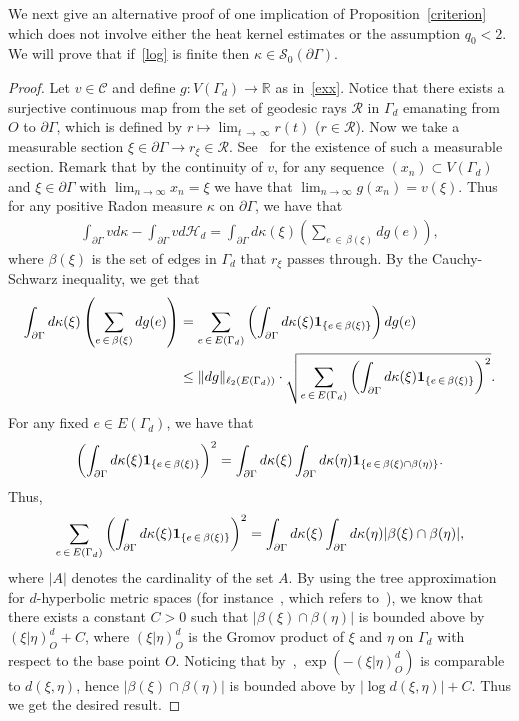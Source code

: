 \documentclass[10pt]{amsart}
\theoremstyle{definition}\newtheorem{defi}[theo]{Definition}\newtheorem{rema}[theo]{Remark}\newtheorem{exam}[theo]{Example}\newtheorem{exem}[theo]{Example}\newtheorem{nota}[theo]{Notation}
\newcommand{\cR}{\mathcal{R}}
\newcommand{\cs}{\mathcal{S}}
\newcommand{\ch}{\mathcal{H}}
\newcommand{\cC}{\mathcal{C}}
\newcommand{\br}{\mathbb{R}}
\begin{document}
We next give an alternative proof of one implication of Proposition~\ref{criterion} which does not involve either the heat kernel estimates or the assumption $q_0<2$. We will prove that if~\eqref{log} is finite then $\kappa\in \cs_0(\partial\Gamma)$.

\begin{proof}
Let $v\in\cC$ and define $g:V(\Gamma_{d})\to\br$ as in~\eqref{exx}. Notice that there exists a surjective continuous map from the set of geodesic rays $\cR$ in $\Gamma_{d}$ emanating from $O$ to $\partial\Gamma$, which is defined by $r\mapsto \lim_{t\,\to\,\infty}r(t)$ ($r\in\cR$). Now we take a measurable section $\xi\in\partial\Gamma\to r_{\xi}\in\cR$. See~\cite[Chapter~I]{Par} for the existence of such a measurable section. Remark that by the continuity of $v$, for any sequence $(x_n)\subset V(\Gamma_{d})$ and $\xi\in\partial\Gamma$ with $\lim_{n\to\infty}x_n=\xi$ we have that $\lim_{n\to\infty}g(x_n)=v(\xi)$. Thus for any positive Radon measure $\kappa$ on $\partial\Gamma$, we have that
\begin{align*}
\int_{\partial\Gamma}vd\kappa-\int_{\partial\Gamma}vd\ch_{d} =\int_{\partial\Gamma}d\kappa(\xi)\left(\sum_{e\,\in\,\beta(\xi)}dg(e)\right),
\end{align*}
where $\beta(\xi)$ is the set of edges in $\Gamma_{d}$ that $r_{\xi}$ passes through. By the Cauchy-Schwarz inequality, we get that
\begin{align*}
\int_{\partial\Gamma}d\kappa(\xi)\left(\sum_{e\,\in\,\beta(\xi)}dg(e)\right) &=\sum_{e\,\in\,E(\Gamma_{d})}\left(\int_{\partial\Gamma}d\kappa(\xi){\bf 1}_{\left\{e\,\in\,\beta(\xi)\right\}}\right)dg(e)\\
&\leq \|dg\|_{\ell_2(E(\Gamma_{d}))}\cdot
\sqrt{
\sum_{e\,\in\,E(\Gamma_{d})}\left(\int_{\partial\Gamma}d\kappa(\xi){\bf 1}_{\left\{e\,\in\,\beta(\xi)\right\}}\right)^2 }.
\end{align*}
For any fixed $e\in E(\Gamma_{d})$, we have that
\begin{align*}
\left(\int_{\partial\Gamma}d\kappa(\xi){\bf 1}_{\left\{e\,\in\,\beta(\xi)\right\}}\right)^2 =\int_{\partial\Gamma}d\kappa(\xi)\int_{\partial\Gamma}d\kappa(\eta){\bf 1}_{\left\{e\,\in\,\beta(\xi)\cap\beta(\eta)\right\}}.
\end{align*}
Thus,
\begin{align*}
\sum_{e\,\in\,E(\Gamma_{d})}\left(\int_{\partial\Gamma}d\kappa(\xi){\bf 1}_{\left\{e\,\in\,\beta(\xi)\right\}}\right)^2 =\int_{\partial\Gamma}d\kappa(\xi)\int_{\partial\Gamma}d\kappa(\eta)|\beta(\xi)\cap\beta(\eta)|,
\end{align*}
where $|A|$ denotes the cardinality of the set $A$. By using the tree approximation for $d$-hyperbolic metric spaces (for instance~\cite[Theorem~1.1]{Coo}, which refers to~\cite{Gro}), we know that there exists a constant $C>0$ such that $|\beta(\xi)\cap\beta(\eta)|$ is bounded above by $(\xi|\eta)_O^{d}+C$, where $(\xi|\eta)_O^{d}$ is the Gromov product of $\xi$ and $\eta$ on $\Gamma_{d}$ with respect to the base point $O$. Noticing that by~\cite[Proposition~2.1]{BP}, $\exp(-(\xi|\eta)^{d}_O)$ is comparable to $d(\xi,\eta)$, hence $|\beta(\xi)\cap\beta(\eta)|$ is bounded above by $|\log d(\xi,\eta)|+C$. Thus we get the desired result.
\end{proof}
\end{document}

